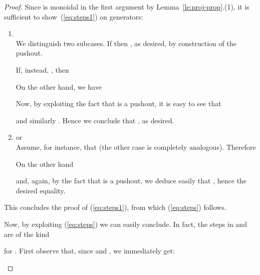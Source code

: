 \documentclass{LMCS}
\begin{document}
\begin{proof}
  Since  is monoidal in the first argument by
  Lemma~\ref{le:proj-prop}.(1), it is sufficient to
  show~(\ref{eq:steps1}) on generators: 



  \begin{enumerate}[]





    \medskip

  \item \\
    We distinguish two subcases. If  then
    , as desired, by
    construction of the pushout.

    If, instead, , then 
\begin{quote}
      
    \end{quote}
    On the other hand, we have
    \begin{quote}
      
    \end{quote}
      
    Now, by exploiting the fact that  is a pushout, it is easy to see that 
    
    and similarly . Hence we conclude that , as desired.
  

    \medskip

  \item  or \\
    Assume, for instance, that  (the other case is completely
    analogous). 
Therefore
    \begin{quote}
      
    \end{quote}
    On the other hand
    \begin{quote}
            
    \end{quote}
    and, again, by the fact that  is a pushout, we deduce easily
    that , hence
    the desired equality.

\end{enumerate}
  This concludes the proof of (\ref{eq:steps1}), from which (\ref{eq:steps})
  follows.
  
  \bigskip
  
  Now, by exploiting (\ref{eq:steps}) we can easily conclude. In fact, the
  steps in  and  are of the kind
  \begin{quote}
    
  \end{quote}
  for . First observe that, since  and , we
  immediately get: 
  \begin{quote}
    

\end{quote}
\end{proof}
\end{document}
